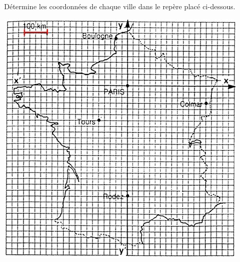
Détermine les coordonnées de chaque ville dans le repère placé ci-dessous.

\includegraphics[scale=0.5]{RepE-20.jpg} 